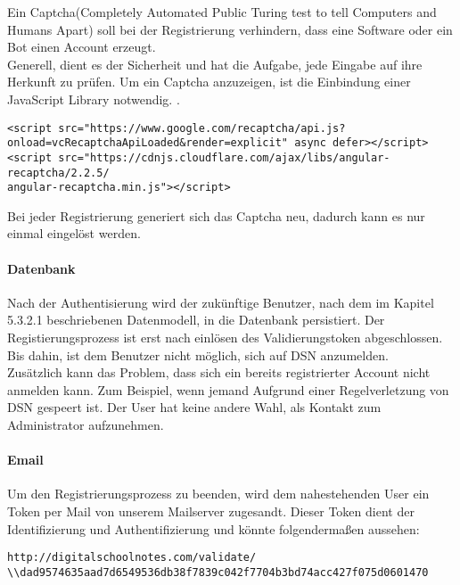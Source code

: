 Ein Captcha(Completely Automated Public Turing test to tell Computers and Humans Apart) soll bei der Registrierung verhindern, dass eine Software oder ein Bot einen Account erzeugt.\\
Generell, dient es der Sicherheit und hat die Aufgabe, jede Eingabe auf ihre Herkunft zu prüfen. Um ein Captcha anzuzeigen, ist die Einbindung einer JavaScript Library notwendig. \cite{CAPTCHA}.
\begin{lstlisting}[caption={Einbindung der JS-Library Recaptcha}]
<script src="https://www.google.com/recaptcha/api.js?
onload=vcRecaptchaApiLoaded&render=explicit" async defer></script>
<script src="https://cdnjs.cloudflare.com/ajax/libs/angular-recaptcha/2.2.5/
angular-recaptcha.min.js"></script>
\end{lstlisting}

Bei jeder Registrierung generiert sich das Captcha neu, dadurch kann es nur einmal eingelöst werden.\\


\paragraph{Datenbank}
Nach der Authentisierung wird der zukünftige Benutzer, nach dem im Kapitel 5.3.2.1 beschriebenen Datenmodell, in die Datenbank persistiert. Der Registierungsprozess ist erst nach einlösen des Validierungstoken abgeschlossen. Bis dahin, ist dem Benutzer nicht möglich, sich auf DSN anzumelden. \\

Zusätzlich kann das Problem, dass sich ein bereits registrierter Account nicht anmelden kann. Zum Beispiel, wenn jemand Aufgrund einer Regelverletzung von DSN gespeert ist. Der User hat keine andere Wahl, als Kontakt zum Administrator aufzunehmen.

\paragraph{Email}
Um den Registrierungsprozess zu beenden, wird dem nahestehenden User ein Token per Mail von unserem Mailserver zugesandt. Dieser Token dient der Identifizierung und Authentifizierung und könnte folgendermaßen aussehen:
\begin{lstlisting}[caption={Validierungstoken für die Aktivierung des DSN-Accounts}]
http://digitalschoolnotes.com/validate/
\\dad9574635aad7d6549536db38f7839c042f7704b3bd74acc427f075d0601470
\end{lstlisting}

